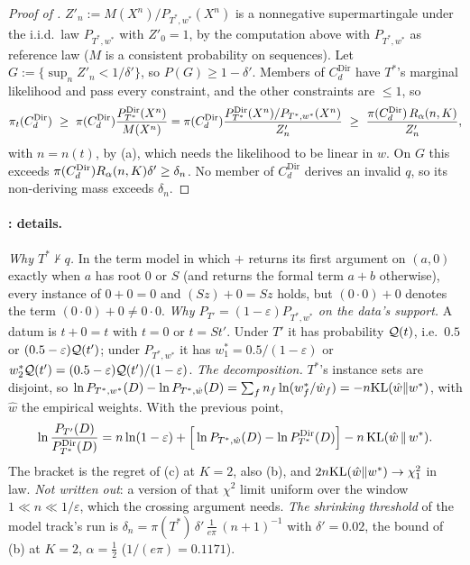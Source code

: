 \begin{proof}[Proof of ]
$Z'_n:=M(X^n)/P_{T^*,w^*}(X^n)$ is a nonnegative supermartingale under the i.i.d.\ law $P_{T^*,w^*}$ with $Z'_0=1$, by the computation above with $P_{T^*,w^*}$ as reference law ($M$ is a consistent probability on sequences). Let $G:=\{\sup_nZ'_n<1/\delta'\}$, so $P(G)\ge1-\delta'$. Members of $C^{\mathrm{Dir}}_d$ have $T^*$'s marginal likelihood and pass every constraint, and the other constraints are $\le1$, so
\[
\pi_t(C^{\mathrm{Dir}}_d)\ \ge\ \pi(C^{\mathrm{Dir}}_d)\frac{\PDir{T^*}(X^n)}{M(X^n)}
=\pi(C^{\mathrm{Dir}}_d)\frac{\PDir{T^*}(X^n)/P_{T^*,w^*}(X^n)}{Z'_n}\ \ge\ \frac{\pi(C^{\mathrm{Dir}}_d)\,\Rreg(n,K)}{Z'_n},
\]
with $n=n(t)$, by (a), which needs the likelihood to be linear in $w$. On $G$ this exceeds $\pi(C^{\mathrm{Dir}}_d)R_{\alpha}(n,K)\delta'\ge\delta_n$. No member of $C^{\mathrm{Dir}}_d$ derives an invalid $q$, so its non-deriving mass exceeds $\delta_n$.
\end{proof}

\paragraph{: details.} \emph{Why $T^*\nvdash q$.} In the term model in which $+$ returns its first argument on $(a,0)$ exactly when $a$ has root $0$ or $S$ (and returns the formal term $a+b$ otherwise), every instance of $0+0=0$ and $(Sz)+0=Sz$ holds, but $(0\cdot0)+0$ denotes the term $(0\cdot0)+0\ne0\cdot0$. \emph{Why $P_{T'}=(1-\varepsilon)P_{T^*,w^*}$ on the data's support.} A datum is $t+0=t$ with $t=0$ or $t=St'$. Under $T'$ it has probability $\mathcal{Q}(t)$, i.e.\ $0.5$ or $(0.5-\varepsilon)\mathcal{Q}(t')$; under $P_{T^*,w^*}$ it has $w^*_1=0.5/(1-\varepsilon)$ or $w^*_2\mathcal{Q}(t')=(0.5-\varepsilon)\mathcal{Q}(t')/(1-\varepsilon)$. \emph{The decomposition.} $T^*$'s instance sets are disjoint, so $\ln P_{T^*,w^*}(D)-\ln P_{T^*,\hat w}(D)=\sum_fn_f\ln(w^*_f/\hat w_f)=-n\mathrm{KL}(\hat w\|w^*)$, with $\hat w$ the empirical weights. With the previous point,
\[
\ln\frac{P_{T'}(D)}{P^{\mathrm{Dir}}_{T^*}(D)}=n\ln(1-\varepsilon)+\Big[\ln P_{T^*,\hat w}(D)-\ln P^{\mathrm{Dir}}_{T^*}(D)\Big]-n\,\mathrm{KL}(\hat w\,\|\,w^*).
\]
The bracket is the regret of (c) at $K=2$, also (b), and $2n\mathrm{KL}(\hat w\|w^*)\to\chi^2_1$ in law. \emph{Not written out}: a version of that $\chi^2$ limit uniform over the window $1\ll n\ll1/\varepsilon$, which the crossing argument needs. \emph{The shrinking threshold} of the model track's run is $\delta_n=\pi(T^*)\,\delta'\,\frac{1}{e\pi}\,(n+1)^{-1}$ with $\delta'=0.02$, the bound of (b) at $K=2$, $\alpha=\tfrac12$ ($1/(e\pi)=0.1171$).

